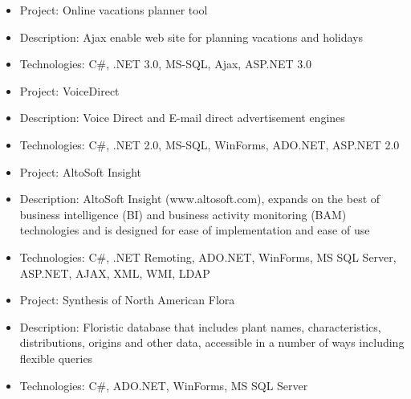 \documentclass{resume}
\begin{document}

\begin{itemize}
  \item Project: Online vacations planner tool
  \item Description: Ajax enable web site for planning vacations and holidays 
  \item Technologies: C#, .NET 3.0, MS-SQL, Ajax, ASP.NET 3.0
\end{itemize}



\begin{itemize}
  \item Project: VoiceDirect 
  \item Description: Voice Direct and E-mail direct advertisement engines
  \item Technologies: C#, .NET 2.0, MS-SQL, WinForms, ADO.NET, ASP.NET 2.0
\end{itemize}



\begin{itemize}
  \item Project: AltoSoft Insight
  \item Description: AltoSoft Insight (www.altosoft.com), expands on the best of business intelligence (BI) and business activity monitoring (BAM) technologies and is designed for ease of implementation and ease of use
  \item Technologies: C#, .NET Remoting, ADO.NET, WinForms, MS SQL Server, ASP.NET, AJAX, XML, WMI, LDAP
\end{itemize}


\begin{itemize}
  \item Project: Synthesis of North American Flora 
  \item Description: Floristic database that includes plant names, characteristics, distributions, origins and other data, accessible in a number of ways including flexible queries
  \item Technologies: C#, ADO.NET, WinForms, MS SQL Server
\end{itemize}
\end{document}
